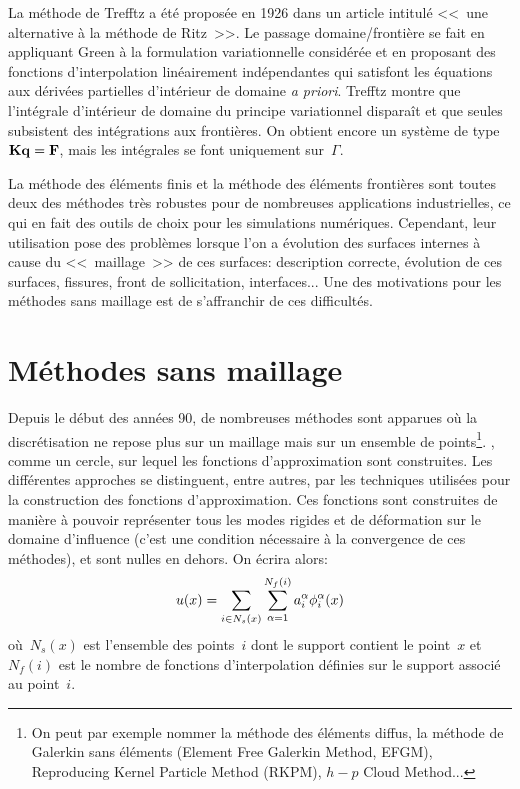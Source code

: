 \medskip
La méthode de Trefftz a été proposée en 1926 dans un article intitulé <<~une alternative à la méthode de Ritz~>>. Le passage domaine/frontière se fait en appliquant Green à la formulation variationnelle considérée et en proposant des fonctions d'interpolation linéairement indépendantes qui satisfont les équations aux dérivées partielles d'intérieur de domaine \emph{a priori}. Trefftz montre que l'intégrale d'intérieur de domaine du principe variationnel disparaît et que seules subsistent des intégrations aux frontières. 
On obtient encore un système de type~$\MM{K}\VV{q}=\VV{F}$, mais les intégrales se font uniquement
sur~$\Gamma$.

\medskip
La méthode des éléments finis et la méthode des éléments frontières sont toutes deux des méthodes très robustes pour de nombreuses applications industrielles, ce qui en fait des outils de choix pour les simulations numériques. Cependant, leur utilisation pose des problèmes lorsque l'on a évolution des surfaces internes à cause du <<~maillage~>> de ces surfaces: description correcte, évolution de ces surfaces, fissures, front de sollicitation, interfaces... Une des motivations pour les méthodes sans maillage est de s'affranchir de ces difficultés.



\medskip
\section{Méthodes sans maillage}\label{Sec-meshless}

Depuis le début des années 90, de nombreuses méthodes sont apparues où la discrétisation ne repose plus sur un maillage mais sur un ensemble de points\footnote{On peut par exemple nommer la méthode des éléments diffus, la méthode de Galerkin sans éléments (Element Free Galerkin Method, EFGM), Reproducing Kernel Particle Method (RKPM), $h-p$ Cloud Method...}. , comme un cercle, sur lequel les fonctions d'approximation sont construites. Les différentes approches se distinguent, entre autres, par les techniques utilisées pour la construction des fonctions d'approximation. Ces fonctions sont construites de manière à pouvoir représenter tous les modes rigides et de déformation sur le domaine d'influence (c'est une condition nécessaire à la convergence de ces méthodes), et sont nulles en dehors. On écrira alors:
\begin{equation}
u(x) = \displaystyle\sum_{i\in N_s(x)}\displaystyle\sum_{\alpha=1}^{N_f(i)} a_i^\alpha \phi_i^\alpha(x)
\end{equation}
où~$N_s(x)$ est l'ensemble des points~$i$ dont le support contient le point~$x$ et~$N_f (i)$ est le nombre de fonctions d'interpolation définies sur le support associé au point~$i$.

